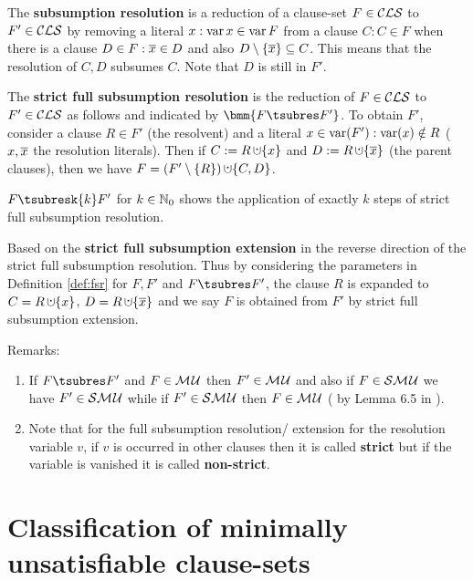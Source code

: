 \documentclass{report}
\begin{document}
\begin{defi}\label{def:sres}
The \textbf{subsumption resolution} is a reduction of a clause-set $F \in \mathcal{CLS}$ to $F' \in \mathcal{CLS}$ by removing a literal $x : \operatorname{var}{x} \in \operatorname{var}{F}$ from a clause $C:C \in F$ when there is a clause $D \in F: \overline x \in D$ and also $D \setminus \{ \overline x \} \subseteq C$. This means that the resolution of $C,D$ subsumes $C$. Note that $D$ is still in $F'$.
\end{defi}

\begin{defi}\label{def:fsr}
\cite{KullmannZhao2010Extremal} The \textbf{strict full subsumption resolution} is the reduction of $F \in \mathcal{CLS}$ to $F'\in \mathcal{CLS}$ as follows and indicated by $\bmm{F \tsubres F'}$. To obtain $F'$, consider a clause $R \in F'$ (the resolvent) and a literal $x \in \operatorname{var}(F'):\operatorname{var}(x) \notin R$ ($x, \overline{x}$ the resolution literals). Then if $C := R \addcup \set{x}$ and $D := R \addcup \set{\ol{x}}$ (the parent clauses), then we have $F = (F' \sm \set{R}) \addcup \set{C,D}$.

$F \tsubresk{k} F'$ for $k \in \mathbb{N}_0$ shows the application of exactly $k$ steps of strict full subsumption resolution. 
\end{defi}
   
\begin{defi}\label{def:fse}
Based on \cite{KullmannZhao2010Extremal} the \textbf{strict full subsumption extension} in the reverse direction of the strict full subsumption resolution. Thus by considering the parameters in Definition \ref{def:fsr} for $F, F'$ and $F \tsubres F'$, the clause $R$ is expanded to $C = R \addcup \set{x}$, $D = R \addcup \set{\ol{x}}$ and we say $F$ is obtained from $F'$ by strict full subsumption extension.
\end{defi}
Remarks:
  \begin{enumerate}
  \item If  $F \tsubres F'$ and $F \in \mathcal{M\hspace{0.8pt}U} $ then $ F' \in \mathcal{M\hspace{0.8pt}U}$ and also if $F \in \mathcal{S}\mathcal{M\hspace{0.8pt}U}$ we have $ F' \in \mathcal{S}\mathcal{M\hspace{0.8pt}U}$ while if $ F' \in \mathcal{S}\mathcal{M\hspace{0.8pt}U}$ then $F \in \mathcal{M\hspace{0.8pt}U} $ ( by Lemma 6.5 in \cite{KullmannZhao2010Extremal}). 
  \item Note that for the full subsumption resolution/ extension for the resolution variable $v$, if $v$ is occurred in other clauses then it is called \textbf{strict} but if the variable is vanished it is called \textbf{non-strict}.
  \end{enumerate}
\section{Classification of minimally unsatisfiable clause-sets}
\label{sec:c-mucls}
\end{document}
